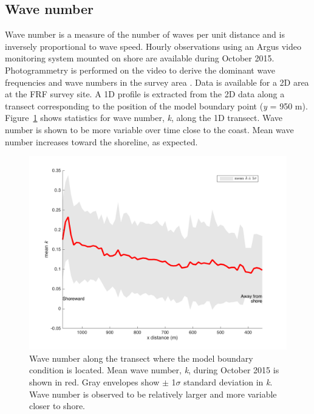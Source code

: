 \subsection{Wave number}
\label{datak}
Wave number is a measure of the number of waves per unit distance and is inversely proportional to wave speed. Hourly observations  using an Argus video monitoring system mounted on shore are available during October 2015. Photogrammetry is performed on the video to derive the dominant wave frequencies and wave numbers in the survey area \citep{holman2013}. Data is available for a 2D area at the FRF survey site. A 1D profile is extracted from the 2D data along a transect corresponding to the position of the model boundary point (\textit{y} = 950 m). Figure~\ref{k1Dmean} shows statistics for wave number, \textit{k}, along the 1D transect. Wave number is shown to be more variable over time close to the coast. Mean wave number increases toward the shoreline, as expected.



\begin{figure}[H]
\centering
\includegraphics[width=.55\linewidth]{img/k1Dmean_std.png}
\caption{Wave number along the transect where the model boundary condition is located. Mean wave number, \textit{k}, during October 2015 is shown in red. Gray envelopes show $\pm$ 1$\sigma$ standard deviation in \textit{k}. Wave number is observed to be relatively larger and more variable closer to shore.}
\label{k1Dmean}
\end{figure}